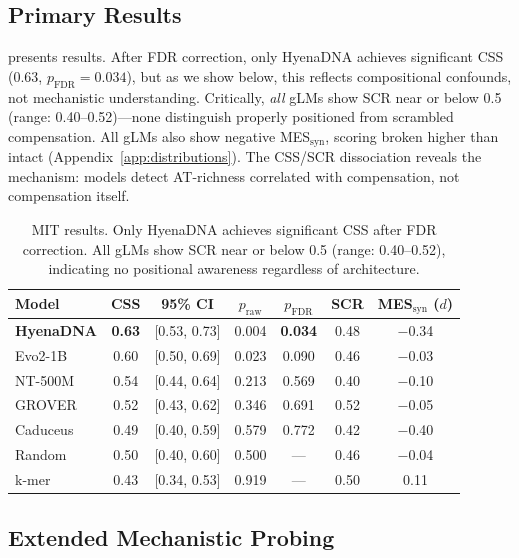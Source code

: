 \documentclass{article}
\begin{document}
\subsection{Primary Results}
\label{sec:results}

 presents results. After FDR correction, only HyenaDNA achieves significant CSS ($0.63$, $p_{\text{FDR}} = 0.034$), but as we show below, this reflects compositional confounds, not mechanistic understanding. Critically, \textit{all} gLMs show SCR near or below 0.5 (range: 0.40--0.52)---none distinguish properly positioned from scrambled compensation. All gLMs also show negative MES$_\text{syn}$, scoring broken higher than intact (Appendix~\ref{app:distributions}). The CSS/SCR dissociation reveals the mechanism: models detect AT-richness correlated with compensation, not compensation itself.

\begin{table}[t]
\caption{MIT results. Only HyenaDNA achieves significant CSS after FDR correction. All gLMs show SCR near or below 0.5 (range: 0.40--0.52), indicating no positional awareness regardless of architecture.}
\label{tab:main_results}
\vskip 0.1in
\begin{center}
\small
\begin{tabular}{lcccccc}
\toprule
Model & CSS & 95\% CI & $p_{\text{raw}}$ & $p_{\text{FDR}}$ & SCR & MES$_\text{syn}$ ($d$) \\
\midrule
\textbf{HyenaDNA} & \textbf{0.63} & [0.53, 0.73] & 0.004 & \textbf{0.034} & 0.48 & $-$0.34 \\
Evo2-1B & 0.60 & [0.50, 0.69] & 0.023 & 0.090 & 0.46 & $-$0.03 \\
NT-500M & 0.54 & [0.44, 0.64] & 0.213 & 0.569 & 0.40 & $-$0.10 \\
GROVER & 0.52 & [0.43, 0.62] & 0.346 & 0.691 & 0.52 & $-$0.05 \\
Caduceus & 0.49 & [0.40, 0.59] & 0.579 & 0.772 & 0.42 & $-$0.40 \\
\midrule
Random & 0.50 & [0.40, 0.60] & 0.500 & --- & 0.46 & $-$0.04 \\
k-mer & 0.43 & [0.34, 0.53] & 0.919 & --- & 0.50 & 0.11 \\
\bottomrule
\end{tabular}
\end{center}
\vskip -0.1in
\end{table}

\subsection{Extended Mechanistic Probing}
\label{sec:extended}
\end{document}
